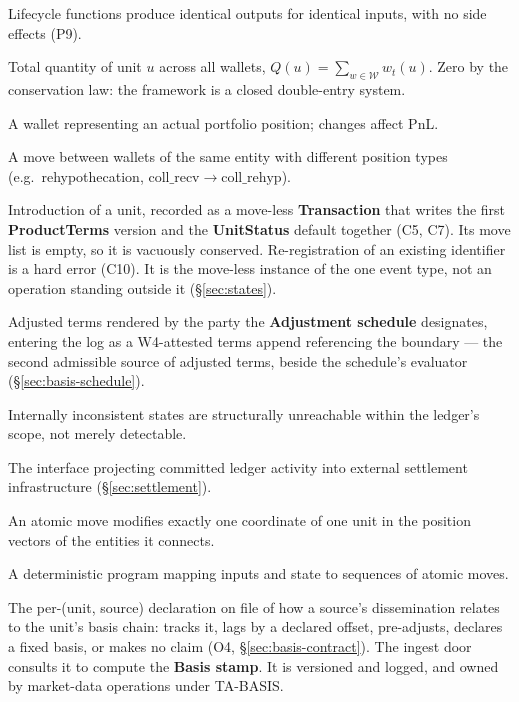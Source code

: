 \begin{description}[style=nextline]
\item[Purity] Lifecycle functions produce identical outputs for identical inputs, with no side effects (P9).

\item[$Q(u)$] Total quantity of unit $u$ across all wallets, $Q(u)=\sum_{w\in\mathcal{W}}w_t(u)$. Zero by the conservation law: the framework is a closed double-entry system.

\item[Real wallet] A wallet representing an actual portfolio position; changes affect PnL.

\item[Reclassification] A move between wallets of the same entity with different position types (e.g.\ rehypothecation, $\mathrm{coll\_recv}\to\mathrm{coll\_rehyp}$).

\item[Registration] Introduction of a unit, recorded as a move-less \textbf{Transaction} that writes the first \textbf{ProductTerms} version and the \textbf{UnitStatus} default together (C5, C7). Its move list is empty, so it is vacuously conserved. Re-registration of an existing identifier is a hard error (C10). It is the move-less instance of the one event type, not an operation standing outside it (\S\ref{sec:states}).

\item[Resolved terms] Adjusted terms rendered by the party the \textbf{Adjustment schedule} designates, entering the log as a W4-attested terms append referencing the boundary --- the second admissible source of adjusted terms, beside the schedule's evaluator (\S\ref{sec:basis-schedule}).

\item[Self-consistency] Internally inconsistent states are structurally unreachable within the ledger's scope, not merely detectable.

\item[Settlement layer] The interface projecting committed ledger activity into external settlement infrastructure (\S\ref{sec:settlement}).

\item[Single-Coordinate Move Principle] An atomic move modifies exactly one coordinate of one unit in the position vectors of the entities it connects.

\item[Smart contract] A deterministic program mapping inputs and state to sequences of atomic moves.

\item[Source basis convention] The per-(unit, source) declaration on file of how a source's dissemination relates to the unit's basis chain: tracks it, lags by a declared offset, pre-adjusts, declares a fixed basis, or makes no claim (O4, \S\ref{sec:basis-contract}). The ingest door consults it to compute the \textbf{Basis stamp}. It is versioned and logged, and owned by market-data operations under TA-BASIS.


\end{description}
